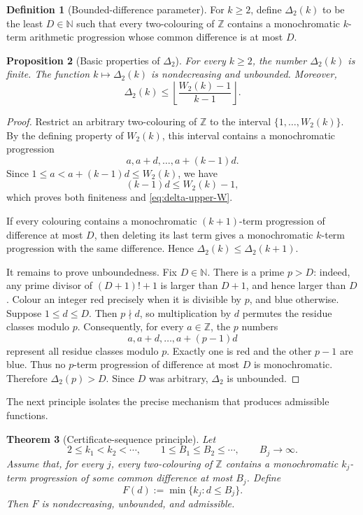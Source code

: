 \documentclass[11pt]{article}
\newtheorem{theorem}{Theorem}[section]
\newtheorem{proposition}[theorem]{Proposition}
\theoremstyle{definition}
\newtheorem{definition}[theorem]{Definition}
\theoremstyle{remark}
\newcommand{\N}{\mathbb N}
\newcommand{\Z}{\mathbb Z}
\newcommand{\DeltaTwo}{\Delta_{2}}
\begin{document}
\begin{definition}[Bounded-difference parameter]\label{def:delta}
For $k\ge2$, define $\DeltaTwo(k)$ to be the least $D\in\N$ such that every two-colouring of $\Z$ contains a monochromatic $k$-term arithmetic progression whose common difference is at most $D$.
\end{definition}

\begin{proposition}[Basic properties of $\DeltaTwo$]\label{prop:delta-basic}
For every $k\ge2$, the number $\DeltaTwo(k)$ is finite. The function $k\mapsto\DeltaTwo(k)$ is nondecreasing and unbounded. Moreover,
\begin{equation}\label{eq:delta-upper-W}
\DeltaTwo(k)\le
\left\lfloor\frac{W_2(k)-1}{k-1}\right\rfloor.
\end{equation}
\end{proposition}

\begin{proof}
Restrict an arbitrary two-colouring of $\Z$ to the interval $\{1,\ldots,W_2(k)\}$. By the defining property of $W_2(k)$, this interval contains a monochromatic progression
\[
a,a+d,\ldots,a+(k-1)d.
\]
Since $1\le a<a+(k-1)d\le W_2(k)$, we have
\[
(k-1)d\le W_2(k)-1,
\]
which proves both finiteness and \eqref{eq:delta-upper-W}.

If every colouring contains a monochromatic $(k+1)$-term progression of difference at most $D$, then deleting its last term gives a monochromatic $k$-term progression with the same difference. Hence $\DeltaTwo(k)\le\DeltaTwo(k+1)$.

It remains to prove unboundedness. Fix $D\in\N$. There is a prime $p>D$: indeed, any prime divisor of $(D+1)!+1$ is larger than $D+1$, and hence larger than $D$. Colour an integer red precisely when it is divisible by $p$, and blue otherwise. Suppose $1\le d\le D$. Then $p\nmid d$, so multiplication by $d$ permutes the residue classes modulo $p$. Consequently, for every $a\in\Z$, the $p$ numbers
\[
a,a+d,\ldots,a+(p-1)d
\]
represent all residue classes modulo $p$. Exactly one is red and the other $p-1$ are blue. Thus no $p$-term progression of difference at most $D$ is monochromatic. Therefore $\DeltaTwo(p)>D$. Since $D$ was arbitrary, $\DeltaTwo$ is unbounded.
\end{proof}

The next principle isolates the precise mechanism that produces admissible functions.

\begin{theorem}[Certificate-sequence principle]\label{thm:certificate-principle}
Let
\[
2\le k_1<k_2<\cdots,
\qquad
1\le B_1\le B_2\le\cdots,
\qquad
B_j\longrightarrow\infty.
\]
Assume that, for every $j$, every two-colouring of $\Z$ contains a monochromatic $k_j$-term progression of some common difference at most $B_j$. Define
\begin{equation}\label{eq:F-certificate}
F(d):=\min\{k_j:d\le B_j\}.
\end{equation}
Then $F$ is nondecreasing, unbounded, and admissible.
\end{theorem}
\end{document}
